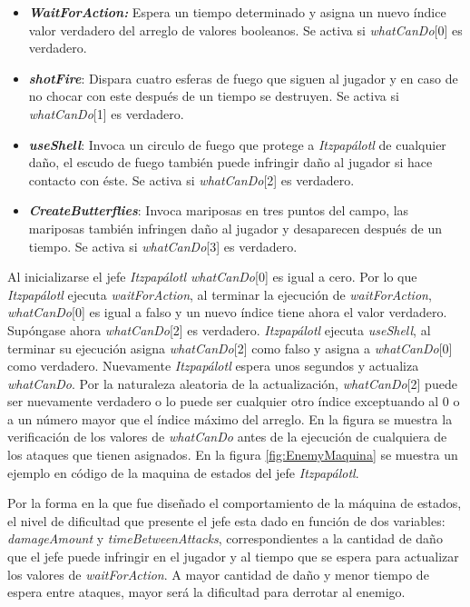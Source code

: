 	\begin{itemize}
		\item \textbf{\textit{WaitForAction:}} Espera un tiempo determinado y asigna 
		un nuevo índice valor verdadero del arreglo de valores booleanos. Se activa 
		si \textit{whatCanDo}[0] es verdadero.
		\item \textbf{\textit{shotFire}}: Dispara cuatro esferas de fuego que siguen 
		al jugador y en caso de no chocar con este después de un tiempo se destruyen.
		Se activa si \textit{whatCanDo}[1] es verdadero.
		\item \textbf{\textit{useShell}}: Invoca un circulo de fuego que protege a 
		\textit{Itzpapálotl} de cualquier daño, el escudo de fuego también puede 
		infringir daño al jugador si hace contacto con éste. Se activa si 
		\textit{whatCanDo}[2] es verdadero.
		\item \textbf{\textit{CreateButterflies}}: Invoca mariposas en tres puntos 
		del campo, las mariposas también infringen daño al jugador y desaparecen 
		después de un tiempo. Se activa si \textit{whatCanDo}[3] es verdadero.
	\end{itemize}
Al inicializarse el jefe \textit{Itzpapálotl whatCanDo}[0] es igual a cero. Por 
lo que \textit{Itzpapálotl} ejecuta \textit{waitForAction}, al terminar la 
ejecución de \textit{waitForAction}, \textit{whatCanDo}[0] es igual a falso y un nuevo 
índice tiene ahora el valor verdadero. Supóngase ahora \textit{whatCanDo}[2] es 
verdadero. \textit{Itzpapálotl} ejecuta \textit{useShell}, al terminar su 
ejecución asigna \textit{whatCanDo}[2] como falso y asigna a \textit{whatCanDo}[0] 
como verdadero. Nuevamente \textit{Itzpapálotl} espera unos segundos y actualiza 
\textit{whatCanDo}. Por la naturaleza aleatoria de la actualización, 
\textit{whatCanDo}[2] puede ser nuevamente verdadero o lo puede ser cualquier 
otro índice exceptuando al 0 o a un número mayor que el índice máximo del 
arreglo. En la figura se muestra la verificación de los valores de 
\textit{whatCanDo} antes de la ejecución de cualquiera de los ataques que 
tienen asignados. En la figura \ref{fig:EnemyMaquina} se muestra un ejemplo en 
código de la maquina de estados del jefe \textit{Itzpapálotl}. 
\\
\par
Por la forma en la que fue diseñado el comportamiento de la máquina de estados, 
el nivel de dificultad que presente el jefe esta dado en función de dos variables: 
\textit{damageAmount} y \textit{timeBetweenAttacks}, correspondientes a la 
cantidad de daño que el jefe puede infringir en el jugador y al tiempo que se 
espera para actualizar los valores de \textit{waitForAction}. A mayor cantidad 
de daño y menor tiempo de espera entre ataques, mayor será la dificultad para 
derrotar al enemigo. 


